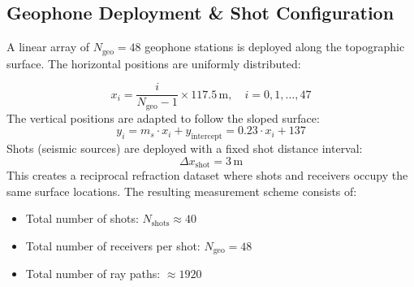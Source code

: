 \subsection*{Geophone Deployment \& Shot Configuration}
A linear array of $N_{\text{geo}} = 48$ geophone stations is deployed along the topographic surface. The horizontal positions are uniformly distributed:

\begin{equation}
x_i = \frac{i}{N_{\text{geo}} - 1} \times 117.5 \, \text{m}, \quad i = 0, 1, \ldots, 47
\end{equation}
The vertical positions are adapted to follow the sloped surface:
\begin{equation}
y_i = m_s \cdot x_i + y_{\text{intercept}} = 0.23 \cdot x_i + 137
\end{equation}
Shots (seismic sources) are deployed with a fixed shot distance interval:
\begin{equation}
\Delta x_{\text{shot}} = 3 \, \text{m}
\end{equation}
This creates a reciprocal refraction dataset where shots and receivers occupy the same surface locations. The resulting measurement scheme consists of:
\begin{itemize}
    \item Total number of shots: $N_{\text{shots}} \approx 40$
    \item Total number of receivers per shot: $N_{\text{geo}} = 48$
    \item Total number of ray paths: $\approx 1920$
\end{itemize}



